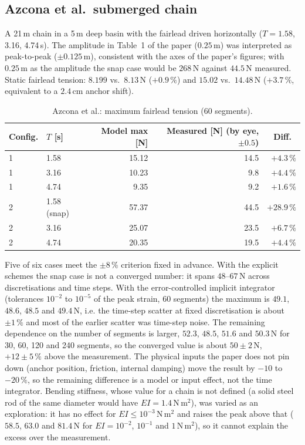 \documentclass[11pt,a4paper]{article}
\begin{document}
\subsection{Azcona et al.\ submerged chain \cite{azcona2017}}
A 21\,m chain in a 5\,m deep basin with the fairlead driven horizontally ($T=1.58$, 3.16, 4.74\,s). The amplitude in Table~1 of the paper ($0.25$\,m) was interpreted as peak-to-peak ($\pm0.125$\,m), consistent with the axes of the paper's figures; with $0.25$\,m as the amplitude the snap case would be $268$\,N against $44.5$\,N measured. Static fairlead tension: $8.199$ vs.\ $8.13$\,N ($+0.9\,\%$) and $15.02$ vs.\ $14.48$\,N ($+3.7\,\%$, equivalent to a $2.4$\,cm anchor shift).
\begin{table}[h]
\centering\small
\begin{tabular}{llrrr}
\toprule
Config. & $T$ [s] & Model max [N] & Measured [N] (by eye, $\pm0.5$) & Diff.\ \\
\midrule
1 & 1.58 & 15.12 & 14.5 & $+4.3\,\%$ \\
1 & 3.16 & 10.23 & 9.8 & $+4.4\,\%$ \\
1 & 4.74 & 9.35 & 9.2 & $+1.6\,\%$ \\
2 & 1.58 (snap) & 57.37 & 44.5 & $\mathbf{+28.9\,\%}$ \\
2 & 3.16 & 25.07 & 23.5 & $+6.7\,\%$ \\
2 & 4.74 & 20.35 & 19.5 & $+4.4\,\%$ \\
\bottomrule
\end{tabular}
\caption{Azcona et al.: maximum fairlead tension (60 segments).}\label{tab:azcona}
\end{table}
Five of six cases meet the $\pm8\,\%$ criterion fixed in advance. With the explicit schemes the snap case is not a converged number: it spans $48$--$67$\,N across discretisations and time steps. With the error-controlled implicit integrator (tolerances $10^{-2}$ to $10^{-5}$ of the peak strain, 60 segments) the maximum is $49.1$, $48.6$, $48.5$ and $49.4$\,N, i.e. the time-step scatter at fixed discretisation is about $\pm1\,\%$ and most of the earlier scatter was time-step noise. The remaining dependence on the number of segments is larger, $52.3$, $48.5$, $51.6$ and $50.3$\,N for 30, 60, 120 and 240 segments, so the converged value is about $50\pm2$\,N, $+12\pm5\,\%$ above the measurement. The physical inputs the paper does not pin down (anchor position, friction, internal damping) move the result by $-10$ to $-20\,\%$, so the remaining difference is a model or input effect, not the time integrator. Bending stiffness, whose value for a chain is not defined (a solid steel rod of the same diameter would have $EI=1.4$\,N\,m$^2$), was varied as an exploration: it has no effect for $EI\le10^{-3}$\,N\,m$^2$ and raises the peak above that ($58.5$, $63.0$ and $81.4$\,N for $EI=10^{-2}$, $10^{-1}$ and $1$\,N\,m$^2$), so it cannot explain the excess over the measurement.
\end{document}
